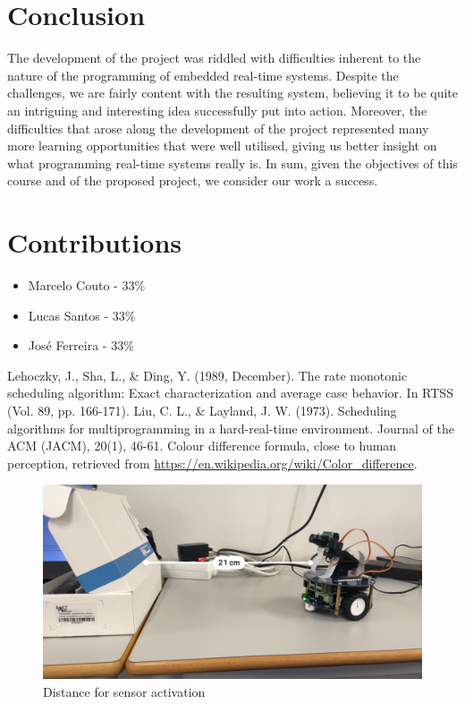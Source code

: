 \documentclass[conference]{IEEEtran}
\begin{document}
\section{Conclusion}

The development of the project was riddled with difficulties inherent to the nature of the programming of embedded real-time systems. Despite the challenges, we are fairly content with the resulting system, believing it to be quite an intriguing and interesting idea successfully put into action. Moreover, the difficulties that arose along the development of the project represented many more learning opportunities that were well utilised, giving us better insight on what programming real-time systems really is. In sum, given the objectives of this course and of the proposed project, we consider our work a success.

\section{Contributions}

\begin{itemize}
    \item Marcelo Couto - 33\% 
    \item Lucas Santos - 33\%
    \item José Ferreira - 33\%
\end{itemize}


\begin{thebibliography}{00}
 Lehoczky, J., Sha, L., \& Ding, Y. (1989, December). The rate monotonic scheduling algorithm: Exact characterization and average case behavior. In RTSS (Vol. 89, pp. 166-171).
 Liu, C. L., \& Layland, J. W. (1973). Scheduling algorithms for multiprogramming in a hard-real-time environment. Journal of the ACM (JACM), 20(1), 46-61.
 Colour difference formula, close to human perception, retrieved from \url{https://en.wikipedia.org/wiki/Color\_difference}.

\end{thebibliography}

\newpage
\appendix

\begin{figure}[h]
    \centering
    \includegraphics[width=\linewidth]{img/distance.jpg}
    \caption{Distance for sensor activation}
    \label{fig:distance}
\end{figure}
\end{document}

